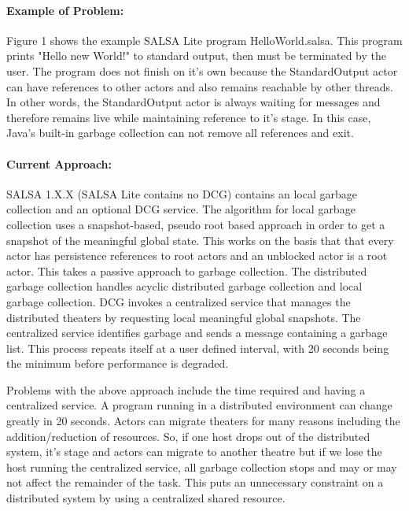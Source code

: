 \documentclass[12pt]{article}
\begin{document}
\paragraph{Example of Problem:} \hspace{-5mm}Figure 1 shows the example SALSA Lite program HelloWorld.salsa. This program prints "Hello new World!" to standard output, then must be terminated by the user. The program does not finish on it's own because the StandardOutput actor can have references to other actors and also remains reachable by other threads. In other words, the StandardOutput actor is always waiting for messages and therefore remains live while maintaining reference to it's stage. In this case, Java's built-in garbage collection can not remove all references and exit. 

\paragraph{Current Approach:} \hspace{-5mm} SALSA 1.X.X (SALSA Lite contains no DCG) contains an local garbage collection and an optional DCG service. The algorithm for local garbage collection uses a snapshot-based, pseudo root based approach in order to get a snapshot of the meaningful global state. This works on the basis that that every actor has persistence references to root actors and an unblocked actor is a root actor. This takes a passive approach to garbage collection. 
The distributed garbage collection handles acyclic distributed garbage collection and local garbage collection. DCG invokes a centralized service that manages the distributed theaters by requesting local meaningful global snapshots. The centralized service identifies garbage and sends a message containing a garbage list. This process repeats itself at a user defined interval, with 20 seconds being the minimum before performance is degraded.

\noindent
Problems with the above approach include the time required and having a centralized service. A program running in a distributed environment can change greatly in 20 seconds. Actors can migrate theaters for many reasons including the addition/reduction of resources. So, if one host drops out of the distributed system, it's stage and actors can migrate to another theatre but if we lose the host running the centralized service, all garbage collection stops and may or may not affect the remainder of the task. This puts an unnecessary constraint on a distributed system by using a centralized shared resource.    
\end{document}
